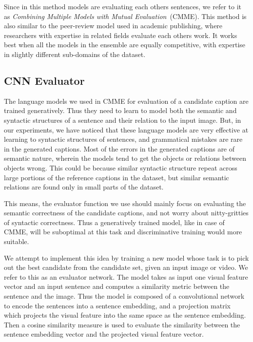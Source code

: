 Since in this method models are evaluating each others sentences, we refer to it
as \emph{Combining Multiple Models with Mutual Evaluation}~(CMME).
This method is also similar to the peer-review model used in academic
publishing, where researchers with expertise in related fields evaluate each
others work.
It works best when all the models in the ensemble are equally competitive, with
expertise in slightly different sub-domains of the dataset.

\subsection{CNN Evaluator}
The language models we used in CMME for evaluation of a candidate caption are
trained generatively.
Thus they need to learn to model both the semantic and syntactic structures of a
sentence and their relation to the input image.
But, in our experiments, we have noticed that these language models are very
effective at learning to syntactic structures of sentences, and grammatical
mistakes are rare in the generated captions.
Most of the errors in the generated captions are of semantic nature, wherein the
models tend to get the objects or relations between objects wrong.
This could be because similar syntactic structure repeat across large portions
of the reference captions in the dataset, but similar semantic relations are
found only in small parts of the dataset.

This means, the evaluator function we use should mainly focus on evaluating the
semantic correctness of the candidate captions, and not worry about
nitty-gritties of syntactic correctness. 
Thus a generatively trained model, like in case of CMME, will be suboptimal at
this task and discriminative training would more suitable. 

We attempt to implement this idea by training a new model whose task
is to pick out the best candidate from the candidate set, given an
input image or video.
We refer to this as an evaluator network.
The model takes as input one visual feature vector and an input sentence and
computes a similarity metric between the sentence and the image. 
Thus the model is composed of a convolutional network to encode the sentences
into a sentence embedding, and a projection matrix which projects the visual
feature into the same space as the sentence embedding.
Then a cosine similarity measure is used to evaluate the similarity between the
sentence embedding vector and the projected visual feature vector. 

